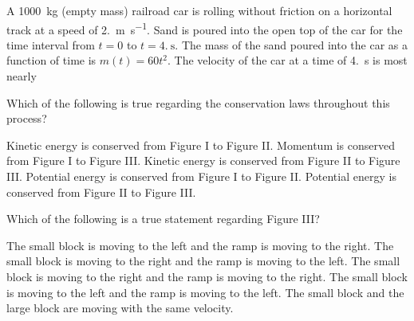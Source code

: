 \documentclass{../../oss-apphys-exam}
\begin{document}
\begin{multicols*}{2}
\begin{questions}
    \question A \SI{1000}{\kilo\gram} (empty mass) railroad car is rolling
    without friction on a horizontal track at a speed of
    \SI{2.}{\metre\per\second}. Sand is poured into the open top of the car for
    the time interval from $t=0$ to $t=\SI{4.}{\second}$. The mass of the sand
    poured into the car as a function of time is $m(t)=60t^2$. The velocity of
    the car at a time of \SI{4.}{\second} is most nearly
    \columnbreak
    

    \question Which of the following is true regarding the conservation laws
    throughout this process?
    \label{ramps1}
    \begin{choices}
      \choice Kinetic energy is conserved from Figure I to Figure II.
      \choice Momentum is conserved from Figure I to Figure III.
      \choice Kinetic energy is conserved from Figure II to Figure III.
      \choice Potential energy is conserved from Figure I to Figure II.
      \choice Potential energy is conserved from Figure II to Figure III.
    \end{choices}
    
    \question Which of the following is a true statement regarding Figure III?
    \label{ramps2}
    \begin{choices}
      \question The small block is moving to the left and the ramp is moving to
      the right.
      \question The small block is moving to the right and the ramp is moving
      to the left.
      \question The small block is moving to the right and the ramp is moving
      to the right.
      \question The small block is moving to the left and the ramp is moving to
      the left.
      \question The small block and the large block are moving with the same
      velocity.
    \end{choices}
    

\end{questions}
\end{multicols*}
\end{document}
